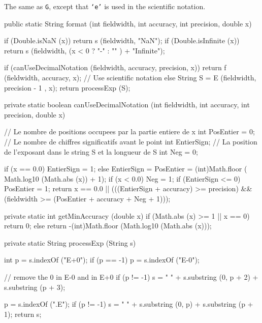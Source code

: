 \begin{tabb} The same as \texttt{G}, except that \texttt{`e'} is used in the scientific
notation.
\end{tabb}
\begin{htmlonly}
\end{htmlonly}
\begin{code}

   public static String format (int fieldwidth, int accuracy, int precision,
                                double x)\begin{hide} {
        if (Double.isNaN (x))
           return s (fieldwidth, "NaN");
        if (Double.isInfinite (x))
           return s (fieldwidth, (x < 0 ? "-" : "" ) + "Infinite");

       if (canUseDecimalNotation (fieldwidth, accuracy, precision, x))
          return f (fieldwidth, accuracy, x);
       // Use scientific notation
       else {
          String S = E (fieldwidth, precision - 1 , x);
          return processExp (S);
       }
   }

   private static boolean canUseDecimalNotation (int fieldwidth, int accuracy,
                                                 int precision, double x) {
      // Le nombre de positions occupees par la partie entiere de x
      int PosEntier = 0;
      // Le nombre de chiffres significatifs avant le point
      int EntierSign;
      // La position de l'exposant dans le string S et la longueur de S
      int Neg = 0;

      if (x == 0.0)
         EntierSign = 1;
      else {
         EntierSign = PosEntier = (int)Math.floor (
               Math.log10 (Math.abs (x)) + 1);
         if (x < 0.0)
             Neg = 1;
      }
      if (EntierSign <= 0)
          PosEntier = 1;
      return x == 0.0 || (((EntierSign + accuracy) >= precision) &&
                          (fieldwidth >= (PosEntier + accuracy + Neg + 1)));
   }

   private static int getMinAccuracy (double x) {
      if (Math.abs (x) >= 1 || x == 0)
         return 0;
      else
         return -(int)Math.floor (Math.log10 (Math.abs (x)));
   }

   private static String processExp (String s) {
      int p = s.indexOf ("E+0");
      if (p == -1)
         p = s.indexOf ("E-0");

      // remove the 0 in E-0 and in E+0
      if (p != -1)
         s = " " + s.substring (0, p + 2) + s.substring (p + 3);

      p = s.indexOf (".E");
      if (p != -1)
         s = " " + s.substring (0, p) + s.substring (p + 1);
      return s;
   }\end{hide}
\end{code}
